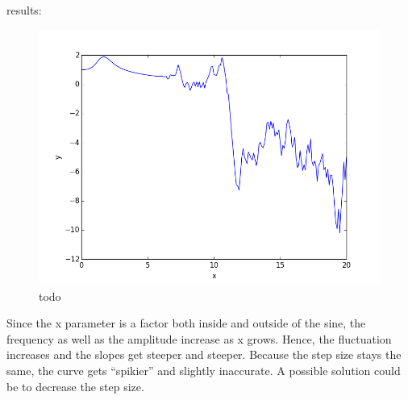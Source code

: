 results:

\begin{figure}[!ht]
\includegraphics[width=1\textwidth]{chapters/images/figure-7-16}
\caption{todo}
\end{figure}



Since the x parameter is a factor both inside and outside of the sine, the frequency as well as the amplitude increase as x grows. Hence, the fluctuation increases and the slopes get steeper and steeper. Because the step size stays the same, the curve gets \enquote{spikier} and slightly inaccurate.
A possible solution could be to decrease the step size.

